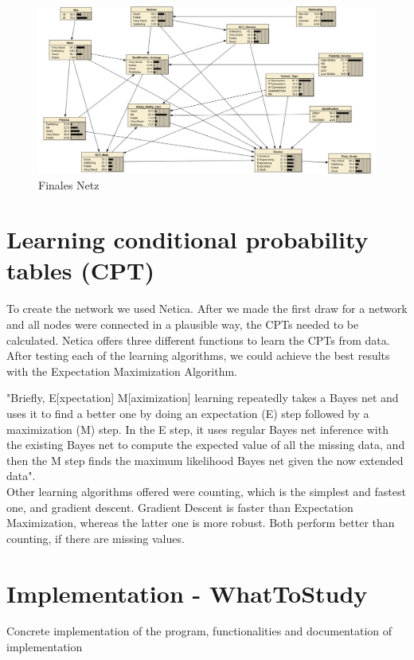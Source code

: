 \documentclass[%
	pdftex,
	oneside,        %
	11pt,           %
	parskip=half,   %
	headsepline,    %
	footsepline,    %
	abstracton,     %
	USenglish,      %
	a4paper,        %
]{report}
\begin{document}
\begin{landscape}
	\begin{figure}
		\includegraphics[width=\linewidth]{StudyNet_final_ohne_State.jpeg}
		\centering
		\caption{Finales Netz}
		\label{FinalesNetz}
	\end{figure}
\end{landscape}
  

\chapter{Learning conditional probability tables (CPT)}
To create the network we used Netica. After we made the first draw for a network and all nodes were connected in a plausible way, the CPTs needed to be calculated. Netica offers three different functions to learn the CPTs from data. After testing each of the learning algorithms, we could achieve the best results with the Expectation Maximization Algorithm.

"Briefly, E[xpectation] M[aximization] learning repeatedly takes a Bayes net and uses it to find a better one by doing an expectation (E) step followed by a maximization (M) step. In the E step, it uses regular Bayes net inference with the existing Bayes net to compute the expected value of all the missing data, and then the M step finds the maximum likelihood Bayes net given the now extended data". \cite{Netica:Online}\\
Other learning algorithms offered were counting, which is the simplest and fastest one, and gradient descent. Gradient Descent is faster than Expectation Maximization, whereas the latter one is more robust. Both perform better than counting, if there are missing values.


\chapter{Implementation - WhatToStudy}
Concrete implementation of the program, functionalities and documentation of implementation

%

\lstlistoflistings
\printbibliography

\begin{appendices}

%

\end{appendices}
\end{document}
